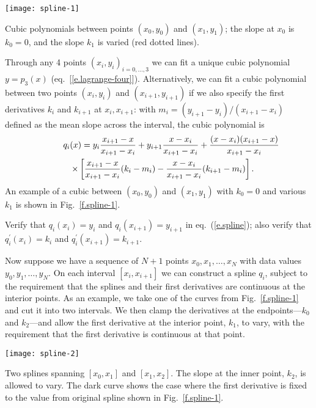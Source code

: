 \begin{marginfigure}
\texttt{[image: spline-1]}
\caption[Cubic polynomial with varying right-hand slopes]{\label{f.spline-1}Cubic polynomials between points $(x_{0},y_{0})$ and $(x_{1},y_{1})$; the slope at $x_{0}$ is $k_{0}=0$, and the slope $k_{1}$ is varied (red dotted lines).}
\end{marginfigure}
Through any 4 points $(x_{i},y_{i})_{i=0,\ldots,3}$ we can fit a unique cubic polynomial $y=p_{3}(x)$ (eq.~[\ref{e.lagrange-four}]).  Alternatively, we can fit a cubic polynomial between two points $(x_{i},y_{i})$ and $(x_{i+1},y_{i+1})$ if we also specify the first derivatives $k_{i}$ and $k_{i+1}$ at $x_{i},x_{i+1}$: with $m_{i} = (y_{i+1}-y_{i})/(x_{i+1}-x_{i})$ defined as the mean slope across the interval, the cubic polynomial is
\begin{eqnarray}
\lefteqn{q_{i}(x) =   y_{i}\frac{x_{i+1}-x}{x_{i+1}-x_{i}} 
		   + y_{i+1}\frac{x-x_{i}}{x_{i+1}-x_{i}}
		   + \frac{(x-x_{i})(x_{i+1}-x)}{x_{i+1}-x_{i}}} && \nonumber\\
		   && \times\left[\frac{x_{i+1}-x}{x_{i+1}-x_{i}}(k_{i}-m_{i})
		       -\frac{x-x_{i}}{x_{i+1}-x_{i}}(k_{i+1}-m_{i})\right].
\label{e.spline}
\end{eqnarray}
An example of a cubic between $(x_{0},y_{0})$ and $(x_{1},y_{1})$ with $k_{0}=0$ and various $k_{1}$ is shown in Fig.~\ref{f.spline-1}.

\begin{exercisebox}
Verify that $q_{i}(x_{i}) = y_{i}$ and $q_{i}(x_{i+1}) = y_{i+1}$ in eq.~(\ref{e.spline}); also verify that $q^{\prime}_{i}(x_{i}) = k_{i}$ and $q^{\prime}_{i}(x_{i+1}) = k_{i+1}$.
\end{exercisebox}

Now suppose we have a sequence of $N+1$ points $x_{0},x_{1},\ldots,x_{N}$ with data values $y_{0},y_{1},\ldots,y_{N}$. On each interval $[x_{i},x_{i+1}]$ we can construct a spline $q_{i}$, subject to the requirement that the splines and their first derivatives are continuous at the interior points. As an example, we take one of the curves from Fig.~\ref{f.spline-1} and cut it into two intervals. We then clamp the derivatives at the endpoints---$k_{0}$ and $k_{2}$---and allow the first derivative at the interior point, $k_{1}$, to vary, with the requirement that the first derivative is continuous at that point.
\begin{marginfigure}
\texttt{[image: spline-2]}
\caption[Two splines connected at an interior point]{\label{f.spline-2} Two splines spanning $[x_{0},x_{1}]$ and $[x_{1},x_{2}]$. The slope at the inner point, $k_{2}$, is allowed to vary. The dark curve shows the case where the first derivative is fixed to the value from original spline shown in Fig.~\ref{f.spline-1}.}
\end{marginfigure}

